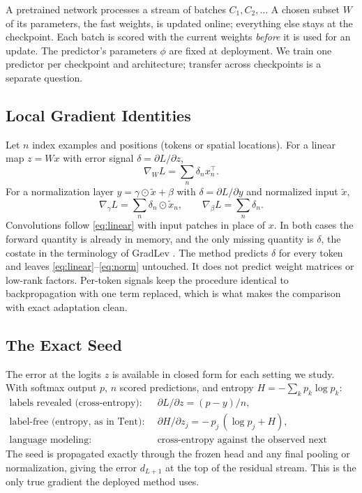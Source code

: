 \documentclass{article}
\begin{document}
A pretrained network processes a stream of batches $C_1, C_2, \dots$ A chosen
subset $W$ of its parameters, the fast weights, is updated online; everything
else stays at the checkpoint. Each batch is scored with the current weights
\emph{before} it is used for an update. The predictor's parameters $\phi$ are
fixed at deployment. We train one predictor per checkpoint and architecture;
transfer across checkpoints is a separate question.

\subsection{Local Gradient Identities}

Let $n$ index examples and positions (tokens or spatial locations). For a
linear map $z = Wx$ with error signal $\delta = \partial L/\partial z$,
\begin{equation}
\nabla_W L = \sum_n \delta_n x_n^\top .
\label{eq:linear}
\end{equation}
For a normalization layer $y = \gamma \odot \tilde{x} + \beta$ with
$\delta = \partial L/\partial y$ and normalized input $\tilde{x}$,
\begin{equation}
\nabla_\gamma L = \sum_n \delta_n \odot \tilde{x}_n, \qquad
\nabla_\beta L = \sum_n \delta_n .
\label{eq:norm}
\end{equation}
Convolutions follow \eqref{eq:linear} with input patches in place of $x$. In
both cases the forward quantity is already in memory, and the only missing
quantity is $\delta$, the costate in the terminology of GradLev
\parencite{liu2026gradlev}. The method predicts $\delta$ for every token and leaves
\eqref{eq:linear}--\eqref{eq:norm} untouched. It does not predict weight
matrices or low-rank factors. Per-token signals keep the procedure identical to
backpropagation with one term replaced, which is what makes the comparison with
exact adaptation clean.

\subsection{The Exact Seed}

The error at the logits $z$ is available in closed form for each setting we
study. With softmax output $p$, $n$ scored predictions, and entropy
$H = -\sum_k p_k \log p_k$:
\begin{align}
\text{labels revealed (cross-entropy):} \quad &
  \partial L/\partial z = (p - y)/n, \\
\text{label-free (entropy, as in Tent):} \quad &
  \partial H/\partial z_j = -\,p_j\,(\log p_j + H), \\
\text{language modeling:} \quad &
  \text{cross-entropy against the observed next token.}
\end{align}
The seed is propagated exactly through the frozen head and any final pooling or
normalization, giving the error $d_{L+1}$ at the top of the residual stream.
This is the only true gradient the deployed method uses.
\end{document}
